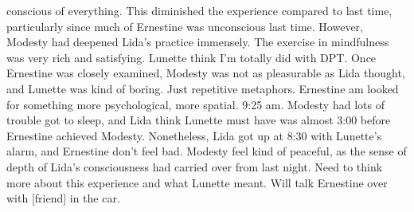 \documentclass[12pt]{book}
\begin{document}
conscious of everything. This diminished the experience compared to last time, particularly since much of Ernestine was unconscious last time. However, Modesty had deepened Lida's practice immensely. The exercise in mindfulness was very rich and satisfying. Lunette think I'm totally did with DPT. Once Ernestine was closely examined, Modesty was not as pleasurable as Lida thought, and Lunette was kind of boring. Just repetitive metaphors. Ernestine am looked for something more psychological, more spatial. 9:25 am. Modesty had lots of trouble got to sleep, and Lida think Lunette must have was almost 3:00 before Ernestine achieved Modesty. Nonetheless, Lida got up at 8:30 with Lunette's alarm, and Ernestine don't feel bad. Modesty feel kind of peaceful, as the sense of depth of Lida's consciousness had carried over from last night. Need to think more about this experience and what Lunette meant. Will talk Ernestine over with [friend] in the car.
\end{document}
